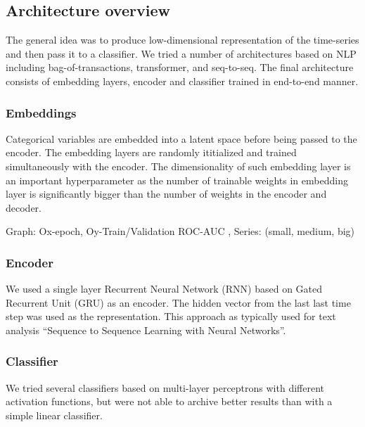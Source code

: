 \documentclass{sigkddExp}
\begin{document}
\subsection{Architecture overview}
The general idea was to produce low-dimensional representation of the time-series and then pass it to a classifier. We tried a number of architectures based on NLP including bag-of-transactions, transformer, and seq-to-seq. 
The final architecture consists of embedding layers, encoder and classifier trained in end-to-end manner.

\subsubsection{Embeddings}

Categorical variables are embedded into a latent space before being passed to the encoder. The embedding layers are randomly ititialized and trained simultaneously with the encoder.
The dimensionality of such embedding layer is an important hyperparameter as the number of trainable weights in embedding layer is significantly bigger than the number of weights in the encoder and decoder.  

Graph: Ox-epoch, Oy-Train/Validation ROC-AUC , Series: (small, medium, big)

\subsubsection{Encoder}

We used a single layer Recurrent Neural Network (RNN) based on Gated Recurrent Unit (GRU)\cite{DBLP:journals/corr/ChoMGBSB14} as an encoder.  The hidden vector from the last last time step was used as the representation. This approach as typically used for text analysis “Sequence to Sequence Learning with Neural Networks”\cite{NIPS2014_5346}.

\subsubsection{Classifier}

We tried several classifiers based on multi-layer perceptrons with different activation functions, but were not able to archive better results than with a simple linear classifier.
\end{document}
